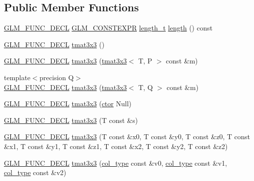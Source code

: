 \subsection*{Public Member Functions}
\begin{DoxyCompactItemize}
\item 
\hyperlink{setup_8hpp_ab2d052de21a70539923e9bcbf6e83a51}{G\+L\+M\+\_\+\+F\+U\+N\+C\+\_\+\+D\+E\+CL} \hyperlink{setup_8hpp_a08b807947b47031d3a511f03f89645ad}{G\+L\+M\+\_\+\+C\+O\+N\+S\+T\+E\+X\+PR} \hyperlink{namespaceglm_a090a0de2260835bee80e71a702492ed9}{length\+\_\+t} \hyperlink{structglm_1_1detail_1_1tmat3x3_a0b4c489fc4d36a368659d7e2d07fd88e}{length} () const
\item 
\hyperlink{setup_8hpp_ab2d052de21a70539923e9bcbf6e83a51}{G\+L\+M\+\_\+\+F\+U\+N\+C\+\_\+\+D\+E\+CL} \hyperlink{structglm_1_1detail_1_1tmat3x3_aec60b37bc72ea2b4f90810110b88a0d6}{tmat3x3} ()
\item 
\hyperlink{setup_8hpp_ab2d052de21a70539923e9bcbf6e83a51}{G\+L\+M\+\_\+\+F\+U\+N\+C\+\_\+\+D\+E\+CL} \hyperlink{structglm_1_1detail_1_1tmat3x3_ad29c55dfadf40179fd4d911535465f6c}{tmat3x3} (\hyperlink{structglm_1_1detail_1_1tmat3x3}{tmat3x3}$<$ T, P $>$ const \&m)
\item 
{\footnotesize template$<$precision Q$>$ }\\\hyperlink{setup_8hpp_ab2d052de21a70539923e9bcbf6e83a51}{G\+L\+M\+\_\+\+F\+U\+N\+C\+\_\+\+D\+E\+CL} \hyperlink{structglm_1_1detail_1_1tmat3x3_a088a58e6773a067fdf873610d46283c1}{tmat3x3} (\hyperlink{structglm_1_1detail_1_1tmat3x3}{tmat3x3}$<$ T, Q $>$ const \&m)
\item 
\hyperlink{setup_8hpp_ab2d052de21a70539923e9bcbf6e83a51}{G\+L\+M\+\_\+\+F\+U\+N\+C\+\_\+\+D\+E\+CL} \hyperlink{structglm_1_1detail_1_1tmat3x3_ac542e26b78b276165616b75632e45f4b}{tmat3x3} (\hyperlink{structglm_1_1detail_1_1tmat3x3_a24175afa829b47d3cc2a65860b16e103}{ctor} Null)
\item 
\hyperlink{setup_8hpp_ab2d052de21a70539923e9bcbf6e83a51}{G\+L\+M\+\_\+\+F\+U\+N\+C\+\_\+\+D\+E\+CL} \hyperlink{structglm_1_1detail_1_1tmat3x3_a4c126cf2520005853e4ce6e4689906c6}{tmat3x3} (T const \&s)
\item 
\hyperlink{setup_8hpp_ab2d052de21a70539923e9bcbf6e83a51}{G\+L\+M\+\_\+\+F\+U\+N\+C\+\_\+\+D\+E\+CL} \hyperlink{structglm_1_1detail_1_1tmat3x3_a879a2f7f841b7fc8c801d9bc3e0b272b}{tmat3x3} (T const \&x0, T const \&y0, T const \&z0, T const \&x1, T const \&y1, T const \&z1, T const \&x2, T const \&y2, T const \&z2)
\item 
\hyperlink{setup_8hpp_ab2d052de21a70539923e9bcbf6e83a51}{G\+L\+M\+\_\+\+F\+U\+N\+C\+\_\+\+D\+E\+CL} \hyperlink{structglm_1_1detail_1_1tmat3x3_afcb075377787c4e8252bd0691658239e}{tmat3x3} (\hyperlink{structglm_1_1detail_1_1tmat3x3_ad47f3a11bd4333d1103bfa93a86fa54f}{col\+\_\+type} const \&v0, \hyperlink{structglm_1_1detail_1_1tmat3x3_ad47f3a11bd4333d1103bfa93a86fa54f}{col\+\_\+type} const \&v1, \hyperlink{structglm_1_1detail_1_1tmat3x3_ad47f3a11bd4333d1103bfa93a86fa54f}{col\+\_\+type} const \&v2)

\end{DoxyCompactItemize}
